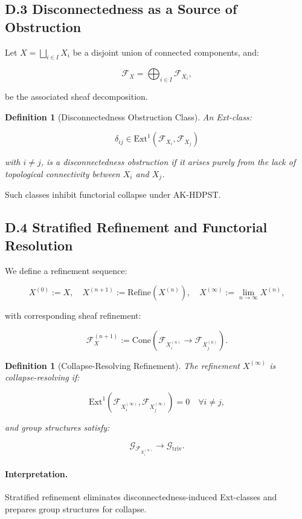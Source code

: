 \documentclass[11pt]{article}
\newtheorem{definition}[theorem]{Definition}
\begin{document}
\subsection*{D.3 Disconnectedness as a Source of Obstruction}

Let \( X = \bigsqcup_{i \in I} X_i \) be a disjoint union of connected components, and:

\[
\mathcal{F}_X = \bigoplus_{i \in I} \mathcal{F}_{X_i},
\]

be the associated sheaf decomposition.

\begin{definition}[Disconnectedness Obstruction Class]
An Ext-class:

\[
\delta_{ij} \in \mathrm{Ext}^1(\mathcal{F}_{X_i}, \mathcal{F}_{X_j})
\]

with \( i \neq j \), is a \emph{disconnectedness obstruction} if it arises purely from the lack of topological connectivity between \( X_i \) and \( X_j \).
\end{definition}

Such classes inhibit functorial collapse under AK-HDPST.

\subsection*{D.4 Stratified Refinement and Functorial Resolution}

We define a refinement sequence:

\[
X^{(0)} := X, \quad X^{(n+1)} := \mathrm{Refine}(X^{(n)}), \quad X^{(\infty)} := \lim_{n \to \infty} X^{(n)},
\]

with corresponding sheaf refinement:

\[
\mathcal{F}_X^{(n+1)} := \mathrm{Cone}(\mathcal{F}_{X^{(n)}_i} \to \mathcal{F}_{X^{(n)}_j}).
\]

\begin{definition}[Collapse-Resolving Refinement]
The refinement \( X^{(\infty)} \) is \emph{collapse-resolving} if:

\[
\mathrm{Ext}^1(\mathcal{F}_{X^{(\infty)}_i}, \mathcal{F}_{X^{(\infty)}_j}) = 0 \quad \forall i \neq j,
\]

and group structures satisfy:

\[
\mathcal{G}_{\mathcal{F}_{X^{(\infty)}_i}} \longrightarrow \mathcal{G}_{\mathrm{triv}}.
\]
\end{definition}

\paragraph{Interpretation.}
Stratified refinement eliminates disconnectedness-induced Ext-classes and prepares group structures for collapse.
\end{document}
